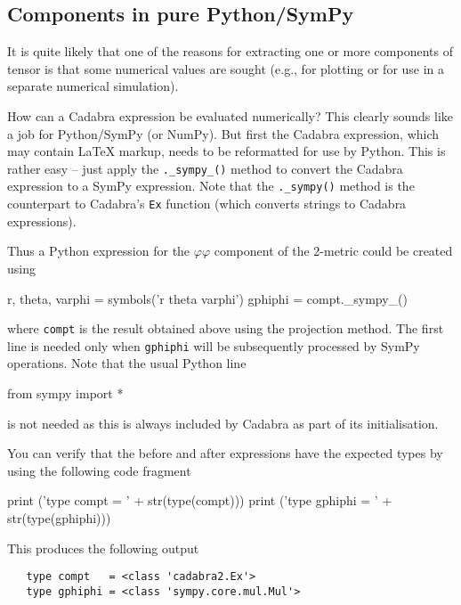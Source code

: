 \documentclass[a4paper,12pt]{article}
\numberwithin{equation}{section}%
\begin{document}
\subsection{Components in pure Python/SymPy}

It is quite likely that one of the reasons for extracting one or more components of tensor
is that some numerical values are sought (e.g., for plotting or for use in a separate
numerical simulation).

How can a Cadabra expression be evaluated numerically? This clearly sounds like a job for
Python/SymPy (or NumPy). But first the Cadabra expression, which may contain LaTeX markup,
needs to be reformatted for use by Python. This is rather easy -- just apply the
\verb|._sympy_()| method to convert the Cadabra expression to a SymPy expression. Note that
the \verb|._sympy()| method is the counterpart to Cadabra's \verb|Ex| function (which
converts strings to Cadabra expressions).

Thus a Python expression for the $\varphi\varphi$ component of the 2-metric could be created
using
\begin{cadabra}[numbers=none]
   r, theta, varphi = symbols('r theta varphi')
   gphiphi = compt._sympy_()
\end{cadabra}
where \verb|compt| is the result obtained above using the projection method. The first line
is needed only when \verb|gphiphi| will be subsequently processed by SymPy operations. Note
that the usual Python line
\begin{cadabra}[numbers=none]
   from sympy import *
\end{cadabra}
is not needed as this is always included by Cadabra as part of its initialisation.

You can verify that the before and after expressions have the expected types by using the
following code fragment
\begin{cadabra}[numbers=none]
   print ('type compt   = ' + str(type(compt)))
   print ('type gphiphi = ' + str(type(gphiphi)))
\end{cadabra}
This produces the following output
\bgroup
\lstset{numbers=none}
\begin{lstlisting}
   type compt   = <class 'cadabra2.Ex'>
   type gphiphi = <class 'sympy.core.mul.Mul'>
\end{lstlisting}
\egroup

\end{document}
